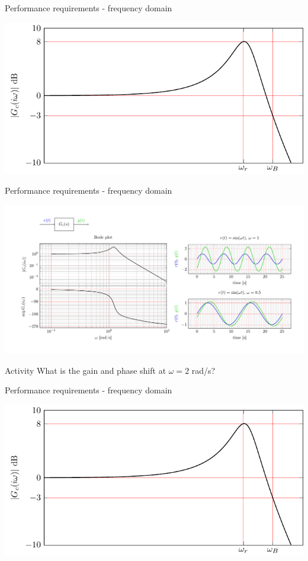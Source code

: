 \documentclass[presentation,aspectratio=169, usenames, dvipsnames]{beamer}
\begin{document}
\begin{frame}[label={sec:orge671087}]{Performance requirements - frequency domain}
\begin{center}
  \includegraphics[width=.8\linewidth]{../../figures/spec-bode-closed-loop-new}
\end{center}
\end{frame}


\begin{frame}[label={sec:orgc811ef0}]{Performance requirements - frequency domain}
\begin{center}
  \includegraphics[width=1.0\linewidth]{../../figures/bode-closed-loop-example-responses}
\end{center}

\pause

\alert{Activity} What is the gain and phase shift at \(\omega = 2\) rad/s?
\end{frame}

\begin{frame}[label={sec:org56bb237}]{Performance requirements - frequency domain}
\begin{center}
  \includegraphics[width=.8\linewidth]{../../figures/spec-bode-closed-loop-new}
\end{center}
\end{frame}
\end{document}
